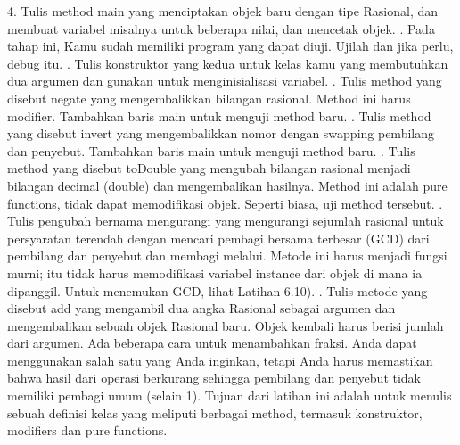 4. Tulis method main yang menciptakan objek baru dengan tipe Rasional, dan membuat variabel misalnya untuk beberapa nilai, dan mencetak objek.
. Pada tahap ini, Kamu sudah memiliki program yang dapat diuji. Ujilah dan jika perlu, debug itu.
. Tulis konstruktor yang kedua untuk kelas kamu yang membutuhkan dua argumen dan gunakan untuk menginisialisasi variabel.
. Tulis method yang disebut negate yang mengembalikkan bilangan rasional. Method ini harus modifier. Tambahkan baris main untuk menguji method baru.
. Tulis method yang disebut invert yang mengembalikkan nomor dengan swapping pembilang dan penyebut. Tambahkan baris main untuk menguji method baru.
. Tulis method yang disebut toDouble yang mengubah bilangan rasional menjadi bilangan decimal (double) dan mengembalikan hasilnya. Method ini adalah pure functions, tidak dapat memodifikasi objek. Seperti biasa, uji method tersebut.
. Tulis pengubah bernama mengurangi yang mengurangi sejumlah rasional untuk persyaratan terendah dengan mencari pembagi bersama terbesar (GCD) dari pembilang dan penyebut dan membagi melalui. Metode ini harus menjadi fungsi murni; itu tidak harus memodifikasi variabel instance dari objek di mana ia dipanggil. Untuk menemukan GCD, lihat Latihan 6.10).
. Tulis metode yang disebut add yang mengambil dua angka Rasional sebagai argumen dan mengembalikan sebuah objek Rasional baru. Objek kembali harus berisi jumlah dari argumen.
\newline
Ada beberapa cara untuk menambahkan fraksi. Anda dapat menggunakan salah satu yang Anda inginkan, tetapi Anda harus memastikan bahwa hasil dari operasi berkurang sehingga pembilang dan penyebut tidak memiliki pembagi umum (selain 1).
\newline
Tujuan dari latihan ini adalah untuk menulis sebuah definisi kelas yang meliputi berbagai method, termasuk konstruktor, modifiers dan pure functions.